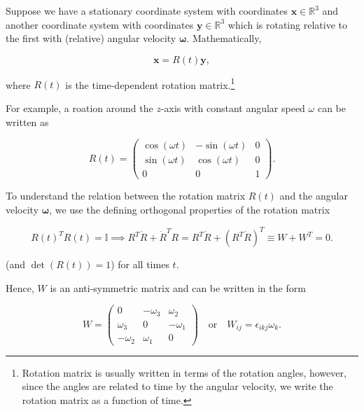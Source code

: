 \documentclass[a4paper,12pt]{report}
\begin{document}
Suppose we have a stationary coordinate system with coordinates \(\mathbf{x} \in \mathbb{R}^3\) and another coordinate system with coordinates \(\mathbf{y} \in \mathbb{R}^3\) which is rotating relative to the first with (relative) angular velocity \(\boldsymbol{\omega } \). Mathematically,

\begin{equation}
\mathbf{x} = R(t) \mathbf{y} ,
\end{equation}

where \( R(t) \) is the time-dependent rotation matrix.\footnote{Rotation matrix is usually written in terms of the rotation angles, however, since the angles are related to time by the angular velocity, we write the rotation matrix as a function of time.} 

For example, a roation around the \(z\)-axis with constant angular speed \(\omega \) can be written as 

\begin{equation}
    R(t) = \begin{pmatrix}
    \cos(\omega t) & -\sin(\omega t) & 0 \\
    \sin(\omega t) & \cos(\omega t) & 0 \\
    0 & 0 & 1
    \end{pmatrix}. \label{simplerotation} 
\end{equation}

To understand the relation between the rotation matrix \(R(t)\) and the angular velocity \(\boldsymbol{\omega } \), we use the defining orthogonal properties of the rotation matrix  

\begin{equation}
R(t)^T R(t) = \mathbb{I} \implies R^T \dot{R} + \dot{R}^T R = R^T \dot{R} + (R^T \dot{R})^T \equiv W + W^T = 0.
\end{equation}

(and \(\det (R(t)) = 1\)) for all times \(t\). 

Hence, \( W \) is an anti-symmetric matrix and can be written in the form

\begin{equation}
W = 
\begin{pmatrix}
0 & -\omega_3 & \omega_2 \\
\omega_3 & 0 & -\omega_1 \\
-\omega_2 & \omega_1 & 0
\end{pmatrix}
\quad \text{or} \quad
W_{ij} = \epsilon_{ikj} \omega_k .
\end{equation}
\end{document}
